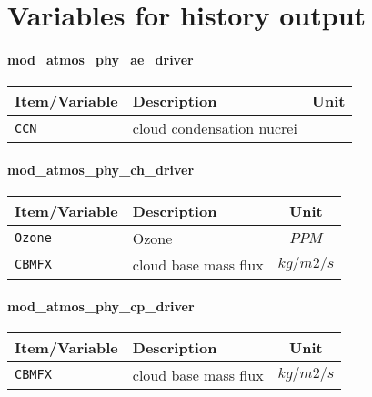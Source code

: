 \chapter{Variables for history output}
\label{app:vari_hist}


\subsubsection{mod\_atmos\_phy\_ae\_driver}
 \begin{tabularx}{150mm}{|l|X|c|} \hline
 \rowcolor[gray]{0.9} Item/Variable & Description  & Unit \\ \hline
    \verb|CCN| & cloud condensation nucrei &   \\ \hline
 \end{tabularx}

\subsubsection{mod\_atmos\_phy\_ch\_driver}
 \begin{tabularx}{150mm}{|l|X|c|} \hline
 \rowcolor[gray]{0.9} Item/Variable & Description  & Unit \\ \hline
  \verb|Ozone| & Ozone & $PPM$  \\\hline
  \verb|CBMFX| & cloud base mass flux & $kg/m2/s$ \\\hline
 \end{tabularx}

\subsubsection{mod\_atmos\_phy\_cp\_driver}
 \begin{tabularx}{150mm}{|l|X|c|} \hline
 \rowcolor[gray]{0.9} Item/Variable & Description  & Unit \\ \hline
  \verb|CBMFX| & cloud base mass flux & $kg/m2/s$ \\\hline
 \end{tabularx}

